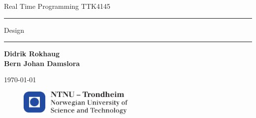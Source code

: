 
\begin{titlepage}
    \begin{center}
    	\large
    	Real Time Programming TTK4145
    \end{center}
    \vspace{\fill}
    \rule{\linewidth}{0.5mm}
    \begin{center}
    	\huge
    	Design
    \end{center}
	\rule{\linewidth}{0.5mm}
	\vspace{\fill}

    \large
    \centering
    \begin{table}[H]
    	\centering
    	\large
    		\textbf{Didrik Rokhaug}\\
            \textbf{Bern Johan Damslora}
    \end{table}
    \vspace{\fill}
    \begin{center}
    	\large
    	\today
    \end{center}
	\vspace{\fill}
    \begin{figure}[H]
    \centering
    \includegraphics[width=0.5\textwidth]{logontnu_eng}
    \end{figure}
    \thispagestyle{empty}
\end{titlepage}
